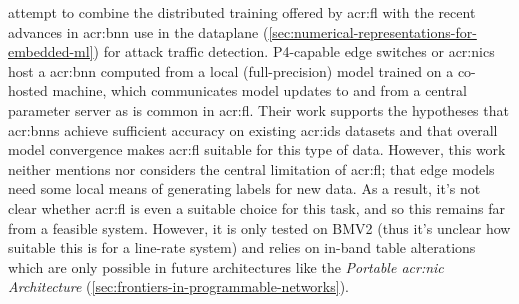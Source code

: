 \Textcite{DBLP:conf/networking/QinPLT20} attempt to combine the distributed training offered by \gls{acr:fl} with the recent advances in \gls{acr:bnn} use in the dataplane (\cref{sec:numerical-representations-for-embedded-ml}) for attack traffic detection.
P4-capable edge switches or \glspl{acr:nic} host a \gls{acr:bnn} computed from a local (full-precision) model trained on a co-hosted machine, which communicates model updates to and from a central parameter server as is common in \gls{acr:fl}.
Their work supports the hypotheses that \glspl{acr:bnn} achieve sufficient accuracy on existing \gls{acr:ids} datasets and that overall model convergence makes \gls{acr:fl} suitable for this type of data.
However, this work neither mentions nor considers the central limitation of \gls{acr:fl}; that edge models need some local means of generating labels for new data.
As a result, it's not clear whether \gls{acr:fl} is even a suitable choice for this task, and so this remains far from a feasible system.
However, it is only tested on BMV2 (thus it's unclear how suitable this is for a line-rate system) and relies on in-band table alterations which are only possible in future architectures like the \emph{Portable \gls{acr:nic} Architecture} (\cref{sec:frontiers-in-programmable-networks}).



